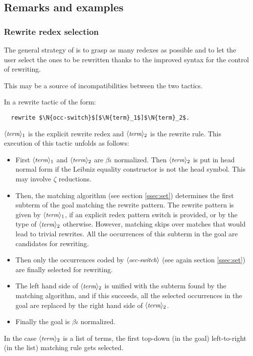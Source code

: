 \subsection{Remarks and examples}\label{ssec:rwex}

\subsubsection*{Rewrite redex selection}
The general strategy of \ssr{}
is to grasp as many redexes as possible and to let the user select the
ones to be rewritten thanks to the improved syntax for the control of
rewriting.

This may be a source of incompatibilities between the two 
tactics.

In a rewrite tactic of the form:
\begin{lstlisting}
  rewrite $\N{occ-switch}$[$\N{term}_1$]$\N{term}_2$.
\end{lstlisting}
$\langle\mbox{\itshape\rmfamily\small term}\rangle_1$ is the explicit rewrite redex and
$\langle\mbox{\itshape\rmfamily\small term}\rangle_2$ is the
rewrite rule. This execution of this tactic unfolds as follows:

\begin{itemize}
\item First $\langle\mbox{\itshape\rmfamily\small term}\rangle_1$ and $\langle\mbox{\itshape\rmfamily\small term}\rangle_2$ are $\beta\iota$ normalized. Then
  $\langle\mbox{\itshape\rmfamily\small term}\rangle_2$ is put in head normal form if the Leibniz equality
  constructor  is not the head symbol. This may involve $\zeta$
  reductions.
\item Then, the matching algorithm (see section \ref{ssec:set})
  determines the first subterm of the goal matching the rewrite pattern.
  The rewrite pattern is
  given by $\langle\mbox{\itshape\rmfamily\small term}\rangle_1$, if an explicit redex pattern switch is provided, or by
  the type of $\langle\mbox{\itshape\rmfamily\small term}\rangle_2$ otherwise. However, matching skips over
  matches that would lead to trivial rewrites. All the
  occurrences of this subterm in the goal are candidates for rewriting.
\item Then only the occurrences coded by $\langle\mbox{\itshape\rmfamily\small occ-switch}\rangle$ (see again
  section \ref{ssec:set}) are finally selected for rewriting.
\item The left hand side of $\langle\mbox{\itshape\rmfamily\small term}\rangle_2$ is unified with the subterm found
  by the matching algorithm, and if this succeeds, all the selected
  occurrences in the goal are replaced by the right hand side of
  $\langle\mbox{\itshape\rmfamily\small term}\rangle_2$.
\item Finally the goal is $\beta\iota$ normalized.
\end{itemize}

In the case $\langle\mbox{\itshape\rmfamily\small term}\rangle_2$ is a list of terms, the first top-down (in
the goal) left-to-right (in the list) matching rule gets selected.

